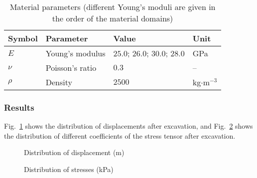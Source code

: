 \begin{table}[!htb]
\centering
\caption{Material parameters (different Young's moduli are given in the order of the material domains)}
\label{Me_tme:el2dHR}
\begin{tabular}{llll}
\toprule
Symbol & Parameter & Value & Unit \\
\midrule
$E$    & Young's modulus & $25.0$; $26.0$; $30.0$; $28.0$   & GPa \\
$\nu$  & Poisson's ratio & $0.3$  & -- \\
$\rho$ & Density         & $2500$ & kg$\cdot$m$^{-3}$ \\
\bottomrule
\end{tabular}
\end{table}

\subsubsection{Results}
\label{subsubsec:Me3_res}

Fig.~\ref{Me_fme:exH_disp} shows the distribution of displacements after excavation, and Fig.~\ref{Me_fme:exH_stress} shows the distribution of different coefficients of the stress tensor after excavation.
\begin{figure}[!thb]
  \begin{center}
  \end{center}
  \caption{Distribution of displacement (m)}
  \label{Me_fme:exH_disp}
\end{figure}
\begin{figure}[!thb]
  \begin{center}
  \end{center}
  \caption{Distribution of stresses (kPa)}
  \label{Me_fme:exH_stress}
\end{figure}
